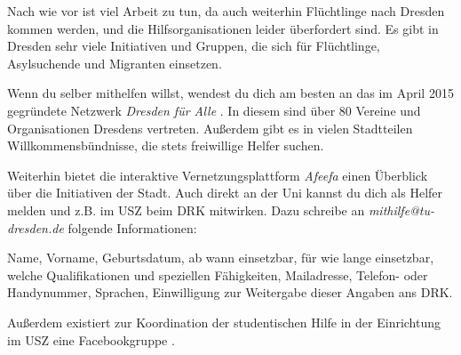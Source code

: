 Nach wie vor ist viel Arbeit zu tun, da auch weiterhin Flüchtlinge nach Dresden kommen werden, und die Hilfsorganisationen leider überfordert sind. Es gibt in Dresden sehr viele Initiativen und Gruppen, die sich für Flüchtlinge, Asylsuchende und Migranten einsetzen. 

Wenn du selber mithelfen willst, wendest du dich am besten an das im April 2015 gegründete Netzwerk \textit{Dresden für Alle} . In diesem sind über 80 Vereine und Organisationen Dresdens vertreten. Außerdem gibt es in vielen Stadtteilen Willkommensbündnisse, die stets freiwillige Helfer suchen.

Weiterhin bietet die interaktive Vernetzungsplattform \textit{Afeefa}  einen Überblick über die Initiativen der Stadt. Auch direkt an der Uni kannst du dich als Helfer melden und z.B. im USZ beim DRK mitwirken. Dazu schreibe an \textit{mithilfe@tu-dresden.de} folgende Informationen:

Name, Vorname, Geburtsdatum, ab wann einsetzbar, für wie lange einsetzbar, welche Qualifikationen und speziellen Fähigkeiten, Mailadresse, Telefon- oder Handynummer, Sprachen, Einwilligung zur Weitergabe dieser Angaben ans DRK.

Außerdem existiert zur Koordination der studentischen Hilfe in der Einrichtung im USZ eine Facebookgruppe .
